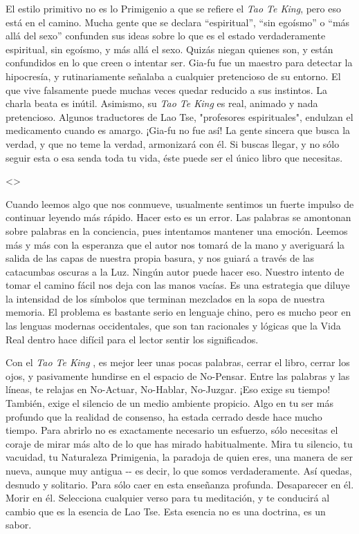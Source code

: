 El estilo primitivo no es lo Primigenio a que se refiere el \emph{Tao Te
King}, pero eso está en el camino. Mucha gente que se declara
``espiritual'', ``sin egoísmo'' o ``más allá del sexo'' confunden sus
ideas sobre lo que es el estado verdaderamente espiritual, sin egoísmo,
y más allá el sexo. Quizás niegan quienes son, y están confundidos en lo
que creen o intentar ser. Gia-fu fue un maestro para detectar la
hipocresía, y rutinariamente señalaba a cualquier pretencioso de su
entorno. El que vive falsamente puede muchas veces quedar reducido a sus
instintos. La charla beata es inútil. Asimismo, su \emph{Tao Te King} es
real, animado y nada pretencioso. Algunos traductores de Lao Tse,
"profesores espirituales", endulzan el medicamento cuando es amargo.
¡Gia-fu no fue así! La gente sincera que busca la verdad, y que no teme
la verdad, armonizará con él. Si buscas llegar, y no sólo seguir esta o
esa senda toda tu vida, éste puede ser el único libro que necesitas.

\textless\textgreater{}

Cuando leemos algo que nos conmueve, usualmente sentimos un fuerte
impulso de continuar leyendo más rápido. Hacer esto es un error. Las
palabras se amontonan sobre palabras en la conciencia, pues intentamos
mantener una emoción. Leemos más y más con la esperanza que el autor nos
tomará de la mano y averiguará la salida de las capas de nuestra propia
basura, y nos guiará a través de las catacumbas oscuras a la Luz. Ningún
autor puede hacer eso. Nuestro intento de tomar el camino fácil nos deja
con las manos vacías. Es una estrategia que diluye la intensidad de los
símbolos que terminan mezclados en la sopa de nuestra memoria. El
problema es bastante serio en lenguaje chino, pero es mucho peor en las
lenguas modernas occidentales, que son tan racionales y lógicas que la
Vida Real dentro hace difícil para el lector sentir los significados.

Con el \emph{Tao Te King} , es mejor leer unas pocas palabras, cerrar el
libro, cerrar los ojos, y pasivamente hundirse en el espacio de
No-Pensar. Entre las palabras y las líneas, te relajas en No-Actuar,
No-Hablar, No-Juzgar. ¡Eso exige su tiempo! También, exige el silencio
de un medio ambiente propicio. Algo en tu ser más profundo que la
realidad de consenso, ha estada cerrado desde hace mucho tiempo. Para
abrirlo no es exactamente necesario un esfuerzo, sólo necesitas el
coraje de mirar más alto de lo que has mirado habitualmente. Mira tu
silencio, tu vacuidad, tu Naturaleza Primigenia, la paradoja de quien
eres, una manera de ser nueva, aunque muy antigua -\/- es decir, lo que
somos verdaderamente. Así quedas, desnudo y solitario. Para sólo caer en
esta enseñanza profunda. Desaparecer en él. Morir en él. Selecciona
cualquier verso para tu meditación, y te conducirá al cambio que es la
esencia de Lao Tse. Esta esencia no es una doctrina, es un sabor.

